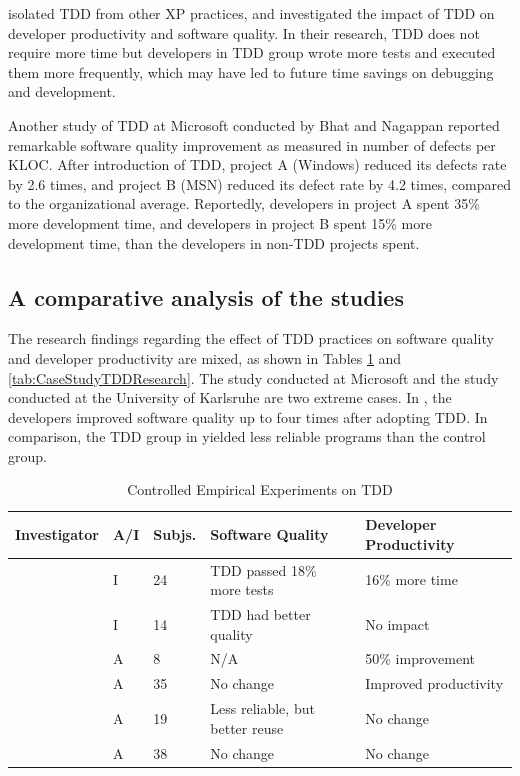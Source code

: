 \documentclass[smallextended]{svjour3}     %
\begin{document}
\cite{Geras:04} isolated TDD from other XP
practices, and investigated the impact of TDD on developer productivity and
software quality. In their research, TDD does not require more time but
developers in TDD group wrote more tests and executed them more frequently,
which may have led to future time savings on debugging and development.

Another study of TDD at Microsoft conducted by Bhat and Nagappan
\citep{Bhat:06} reported remarkable software quality improvement as 
measured in number of defects per KLOC. After introduction of TDD, 
project A (Windows) reduced its defects rate by 2.6 times, and project 
B (MSN) reduced its defect rate by 4.2 times, compared to the organizational
average. Reportedly, developers in project A spent 35\% more development
time, and developers in project B spent 15\% more development time, than
the developers in non-TDD projects spent.

\subsection{A comparative analysis of the studies}

The research findings regarding the effect of TDD practices on software quality 
and developer productivity are mixed,  as shown in 
Tables \ref{tab:ControlledTDDResearch} and \ref{tab:CaseStudyTDDResearch}. 
The study conducted at Microsoft \citep{Bhat:06} and the study conducted 
at the University of Karlsruhe \citep{Muller:02} are two extreme cases. In 
\cite{Bhat:06}, the developers improved software quality up to four 
times after adopting TDD. In comparison, the TDD group in \cite{Muller:02} 
yielded less reliable programs than the control group. 

\begin{table}[ht]
\caption{Controlled Empirical Experiments on TDD}
\begin{tabular}{|l|l|l|p{1.0in}|p{1.0in}|} \hline 
Investigator      & A/I & Subjs.	& Software Quality	& Developer Productivity \\ \hline
\cite{George:04}  & I & 24	& TDD passed 18\% more tests & 16\% more time \\ \hline
\cite{Geras:04}   & I & 14	& TDD had better quality & No impact \\ \hline 
\cite{Kaufmann:03}& A &  8 & N/A	    & 50\% improvement \\ \hline
\cite{Erdogmus:05}& A & 35	& No change	  & Improved productivity \\ \hline
\cite{Muller:02}  & A & 19 & Less reliable, but better reuse	& No change \\ \hline
\cite{Matjaz:03}  & A & 38	& No change	  & No change \\ \hline
\end{tabular}
\label{tab:ControlledTDDResearch}
\end{table}
\end{document}
